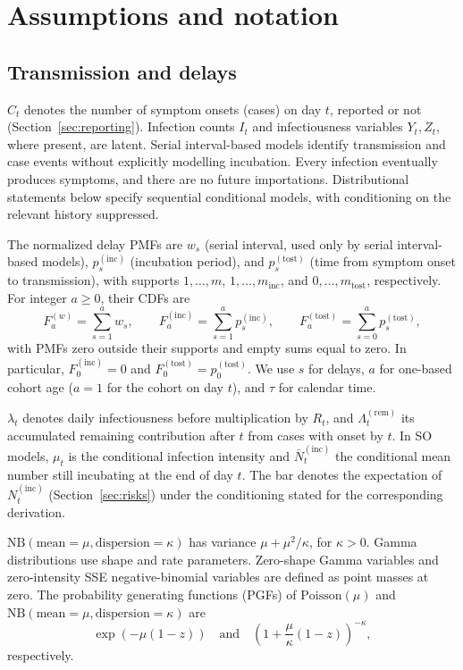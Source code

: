 \documentclass{article}
\newcommand{\PoissonDist}[1]{\mathrm{Poisson}\left(#1\right)}
\newcommand{\NBDist}[2]{\mathrm{NB}\left(\mathrm{mean}=#1,
\mathrm{dispersion}=#2\right)}
\newcommand{\incPMF}{p^{(\mathrm{inc})}}
\newcommand{\tostPMF}{p^{(\mathrm{tost})}}
\begin{document}
\section{Assumptions and notation}
\subsection{Transmission and delays}

\(C_t\) denotes the number of symptom onsets (cases) on day \(t\),
reported or not (Section~\ref{sec:reporting}). Infection counts \(I_t\)
and infectiousness variables \(Y_t,Z_t\), where present, are latent.
Serial interval-based models identify transmission and case events without
explicitly modelling incubation. Every infection eventually produces symptoms,
and there are no future importations. Distributional statements below
specify sequential conditional models, with conditioning on the relevant
history suppressed.

The normalized delay PMFs are \(w_s\) (serial interval, used only by
serial interval-based models), \(\incPMF_s\) (incubation period), and
\(\tostPMF_s\) (time from symptom onset to transmission), with supports
\(1,\ldots,m\),
\(1,\ldots,m_{\mathrm{inc}}\), and \(0,\ldots,m_{\mathrm{tost}}\),
respectively. For integer \(a\geq0\), their CDFs are
\begin{equation}
  F_a^{(w)}=\sum_{s=1}^{a}w_s,\qquad
  F_a^{(\mathrm{inc})}=\sum_{s=1}^{a}\incPMF_s,\qquad
  F_a^{(\mathrm{tost})}=\sum_{s=0}^{a}\tostPMF_s,
\end{equation}
with PMFs zero outside their supports and empty sums equal to zero.
In particular, \(F_0^{(\mathrm{inc})}=0\) and
\(F_0^{(\mathrm{tost})}=\tostPMF_0\).
We use \(s\) for delays, \(a\) for one-based cohort age
(\(a=1\) for the cohort on day \(t\)), and \(\tau\) for calendar time.

\(\lambda_t\) denotes daily infectiousness before multiplication by
\(R_t\), and \(\Lambda_t^{(\mathrm{rem})}\) its accumulated remaining
contribution after \(t\) from cases with onset by \(t\). In SO models,
\(\mu_t\) is the conditional infection intensity and
\(\bar N_t^{(\mathrm{inc})}\) the conditional mean number still incubating
at the end of day \(t\). The bar denotes the expectation of
\(N_t^{(\mathrm{inc})}\) (Section~\ref{sec:risks}) under the conditioning
stated for the corresponding derivation.

\(\NBDist{\mu}{\kappa}\) has variance \(\mu+\mu^2/\kappa\),
for \(\kappa>0\). Gamma distributions use shape and rate parameters.
Zero-shape Gamma variables and zero-intensity SSE negative-binomial
variables are defined as point masses at zero. The probability generating
functions (PGFs) of \(\PoissonDist{\mu}\) and \(\NBDist{\mu}{\kappa}\) are
\begin{equation}
  \exp\left(-\mu(1-z)\right)\quad\text{and}\quad
  \left(1+\frac{\mu}{\kappa}(1-z)\right)^{-\kappa},
\end{equation}
respectively.
\end{document}
